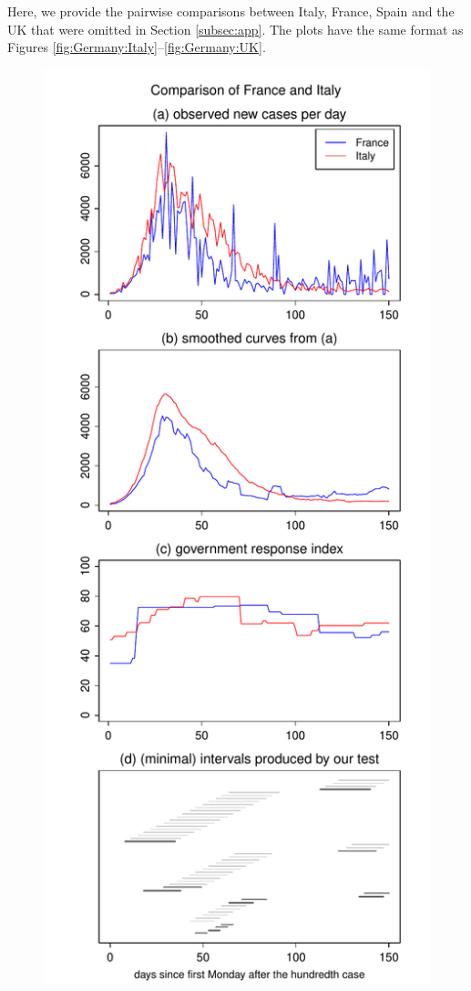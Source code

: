 \documentclass[a4paper,12pt]{article}
\numberwithin{equation}{section}
\begin{document}
Here, we provide the pairwise comparisons between Italy, France, Spain and the UK that were omitted in Section \ref{subsec:app}. The plots have the same format as Figures \ref{fig:Germany:Italy}--\ref{fig:Germany:UK}. 


\begin{figure}[h!]
\begin{minipage}[t]{0.49\textwidth}
\includegraphics[width=\textwidth]{plots/FRA_vs_ITA}

\end{minipage}
\end{figure}
\end{document}
